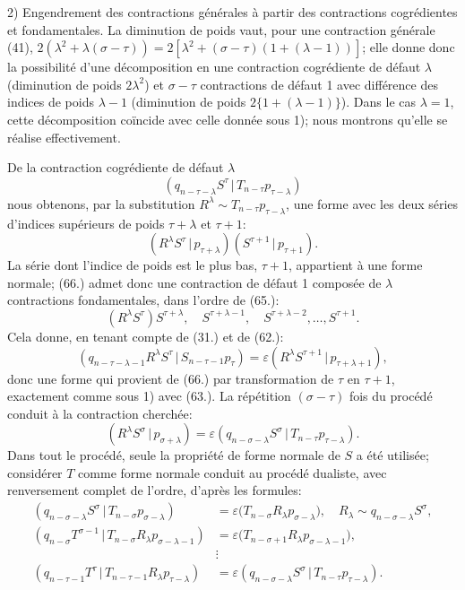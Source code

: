\documentclass[11pt]{article}
\newcommand{\pair}[2]{(#1\,|\,#2)}
\newcommand{\eps}{\varepsilon}
\begin{document}
2) Engendrement des contractions générales à partir des contractions cogrédientes et fondamentales. La diminution de poids vaut, pour une contraction générale (41), $2(\lambda^2+\lambda(\sigma-\tau))=2[\lambda^2+(\sigma-\tau)(1+(\lambda-1))]$; elle donne donc la possibilité d'une décomposition en une contraction cogrédiente de défaut $\lambda$ (diminution de poids $2\lambda^2$) et $\sigma-\tau$ contractions de défaut 1 avec différence des indices de poids $\lambda-1$ (diminution de poids $2\{1+(\lambda-1)\}$). Dans le cas $\lambda=1$, cette décomposition coïncide avec celle donnée sous 1); nous montrons qu'elle se réalise effectivement.

De la contraction cogrédiente de défaut $\lambda$
\[
 \pair{q_{n-\tau-\lambda}S^\tau}{T_{n-\tau}p_{\tau-\lambda}}
\]
nous obtenons, par la substitution $R^\lambda\sim T_{n-\tau}p_{\tau-\lambda}$, une forme avec les deux séries d'indices supérieurs de poids $\tau+\lambda$ et $\tau+1$:
\begin{equation}
 \pair{R^\lambda S^\tau}{p_{\tau+\lambda}}\pair{S^{\tau+1}}{p_{\tau+1}}.
\tag{66}
\end{equation}
La série dont l'indice de poids est le plus bas, $\tau+1$, appartient à une forme normale; (66.) admet donc une contraction de défaut 1 composée de $\lambda$ contractions fondamentales, dans l'ordre de (65.):
\[
 (R^\lambda S^\tau)S^{\tau+\lambda},\quad S^{\tau+\lambda-1},\quad S^{\tau+\lambda-2},\ldots,S^{\tau+1}.
\]
Cela donne, en tenant compte de (31.) et de (62.):
\[
 \pair{q_{n-\tau-\lambda-1}R^\lambda S^\tau}{S_{n-\tau-1}p_\tau}=\eps\pair{R^\lambda S^{\tau+1}}{p_{\tau+\lambda+1}},
\]
donc une forme qui provient de (66.) par transformation de $\tau$ en $\tau+1$, exactement comme sous 1) avec (63.). La répétition $(\sigma-\tau)$ fois du procédé conduit à la contraction cherchée:
\[
 \pair{R^\lambda S^\sigma}{p_{\sigma+\lambda}}=\eps\pair{q_{n-\sigma-\lambda}S^\sigma}{T_{n-\tau}p_{\tau-\lambda}}.
\]
Dans tout le procédé, seule la propriété de forme normale de $S$ a été utilisée; considérer $T$ comme forme normale conduit au procédé dualiste, avec renversement complet de l'ordre, d'après les formules:
\begin{align*}
\pair{q_{n-\sigma-\lambda}S^\sigma}{T_{n-\sigma}p_{\sigma-\lambda}}&=\eps\bigl(T_{n-\sigma}R_\lambda p_{\sigma-\lambda}\bigr),\quad R_\lambda\sim q_{n-\sigma-\lambda}S^\sigma,\\
\pair{q_{n-\sigma}T^{\sigma-1}}{T_{n-\sigma}R_\lambda p_{\sigma-\lambda-1}}&=\eps\bigl(T_{n-\sigma+1}R_\lambda p_{\sigma-\lambda-1}\bigr),\\
&\vdots\\
\pair{q_{n-\tau-1}T^\tau}{T_{n-\tau-1}R_\lambda p_{\tau-\lambda}}&=\eps\pair{q_{n-\sigma-\lambda}S^\sigma}{T_{n-\tau}p_{\tau-\lambda}}.
\end{align*}
\end{document}
